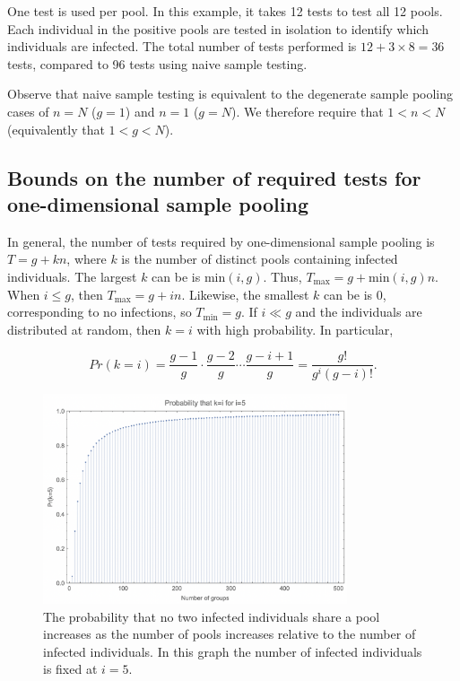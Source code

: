 \documentclass[letterpaper]{article}
\begin{document}
One test is used per pool. In this example, it takes 12 tests to test
all 12 pools. Each individual in the positive pools are tested in
isolation to identify which individuals are infected. The total number
of tests performed is $12 + 3\times 8 = 36$ tests, compared to 96
tests using naive sample testing.

Observe that naive sample testing is equivalent to the degenerate sample
pooling cases of $n=N$ ($g=1$) and $n=1$ ($g=N$). We therefore
require that $1<n<N$ (equivalently that $1<g<N$).

\hypertarget{bounds-on-the-number-of-required-tests-for-one-dimensional-sample-pooling}{%
\subsection{Bounds on the number of required tests for one-dimensional sample pooling}
\label{bounds-on-the-number-of-required-tests-for-one-dimensional-sample-pooling}}

In general, the number of tests required by one-dimensional sample
pooling is $T = g + kn$, where $k$ is the number of distinct pools
containing infected individuals. The largest $k$ can be is
$\text{min}(i, g)$. Thus, $T_{\text{max}}=g + \text{min}(i,g)n$. When
$i\leq g$, then $T_{\text{max}}=g + in$. Likewise, the smallest
$k$ can be is $0$, corresponding to no infections, so
$T_{\text{min}}=g$. If $i\ll g$ and the individuals are distributed
at random, then $k=i$ with high probability. In particular,

\[Pr(k=i)=\frac{g-1}{g}\cdot \frac{g-2}{g}\cdots \frac{g-i+1}{g} = \frac{g!}{g^{i}(g-i)!}.\]


\begin{figure}
	\centering
	\includegraphics[width=0.8\textwidth]{Prki.png}
	\caption{The probability that no two infected individuals share a
		pool increases as the number of pools increases relative to the number
		of infected individuals. In this graph the number of infected
		individuals is fixed at $i=5$.}
\end{figure}
\end{document}
